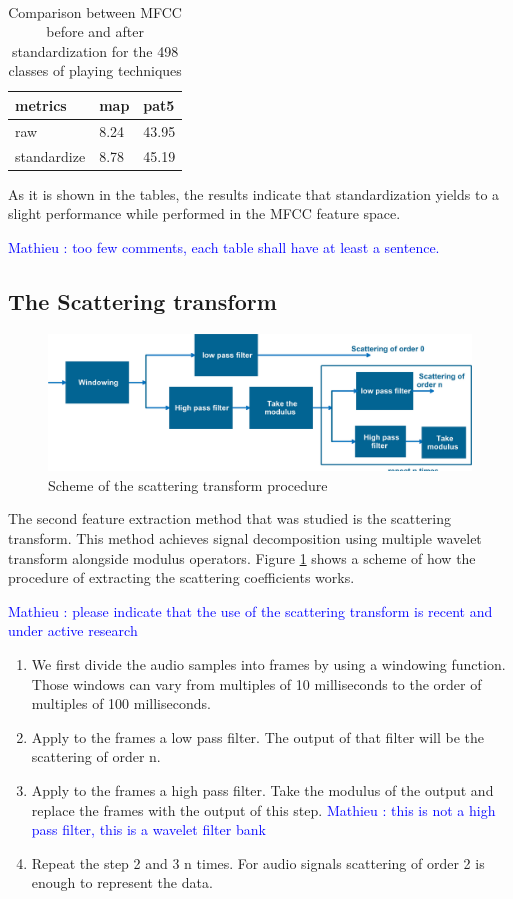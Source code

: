 \documentclass[hidelinks,12pt]{report}
\newcommand{\ml}[1]{\textcolor{blue}{ Mathieu : #1}}
\begin{document}
\begin{table}[H]
\begin{center} 
\ 
 \setlength{\tabcolsep}{.16667em} 
\begin{tabular}{|l|l|l|} 
metrics & map & pat5  \\ 
\hline 
raw & 8.24 & 43.95  \\ 
standardize & 8.78 & 45.19  \\ 

\end{tabular} 
\end{center} 
\caption{Comparison between MFCC before and after standardization for the 498 classes of playing techniques} 
\label{me} 
\end{table}
As it is shown in the tables, the results indicate that standardization yields to a slight performance while performed in the MFCC feature space.

\ml{too few comments, each table shall have at least a sentence.}

\subsection{The Scattering transform}
\begin{figure}[t!]
  
  \centering
	    \includegraphics[width=1\textwidth]{scattering}
    \caption{Scheme of the scattering transform procedure }
    \label{scat}
\end{figure}
The second feature extraction method that was studied is the scattering transform. This method achieves signal decomposition using multiple wavelet transform alongside modulus operators. Figure \ref{scat} shows a scheme of how the procedure of extracting the scattering coefficients works. 

\ml{please indicate that the use of the scattering transform is recent and under active research}

\begin{enumerate}
\item We first divide the audio samples into frames by using a windowing function. Those windows can vary from multiples of 10 milliseconds to the order of multiples of 100 milliseconds.  
\item Apply to the frames a low pass filter. The output of that filter will be the scattering of order n.
\item Apply to the frames a high pass filter. Take the modulus of the output and replace the frames with the output of this step. \ml{this is not a high pass filter, this is a wavelet filter bank}
\item Repeat the step 2 and 3 n times. For audio signals scattering of order 2 is enough to represent the data.
\end{enumerate}
\end{document}
